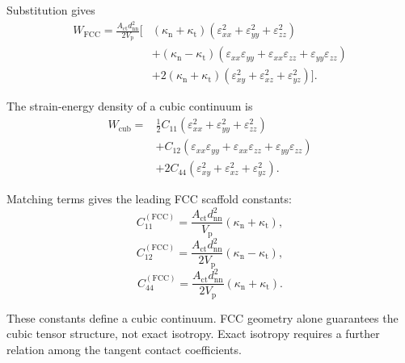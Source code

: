 Substitution gives
\begin{equation}
\begin{aligned}
    W_{\mathrm{FCC}} = \frac{A_{\mathrm{ct}}d_{\mathrm{nn}}^2}{2V_{\mathrm{p}}} \Big[ & (\kappa_{\mathrm{n}}+\kappa_{\mathrm{t}}) (\varepsilon_{xx}^2+\varepsilon_{yy}^2+\varepsilon_{zz}^2) \\
    & + (\kappa_{\mathrm{n}}-\kappa_{\mathrm{t}}) (\varepsilon_{xx}\varepsilon_{yy} +\varepsilon_{xx}\varepsilon_{zz} +\varepsilon_{yy}\varepsilon_{zz}) \\
    & + 2(\kappa_{\mathrm{n}}+\kappa_{\mathrm{t}}) (\varepsilon_{xy}^2+\varepsilon_{xz}^2+\varepsilon_{yz}^2) \Big].
\end{aligned}
\end{equation}

The strain-energy density of a cubic continuum is
\begin{equation}
\begin{aligned}
    W_{\mathrm{cub}} ={}& \frac{1}{2} C_{11} (\varepsilon_{xx}^2+\varepsilon_{yy}^2+\varepsilon_{zz}^2) \\
    & + C_{12} (\varepsilon_{xx}\varepsilon_{yy} +\varepsilon_{xx}\varepsilon_{zz} +\varepsilon_{yy}\varepsilon_{zz}) \\
    & + 2C_{44} (\varepsilon_{xy}^2+\varepsilon_{xz}^2+\varepsilon_{yz}^2).
\end{aligned}
\end{equation}

Matching terms gives the leading FCC scaffold constants:
\begin{equation}
    C_{11}^{(\mathrm{FCC})} = \frac{A_{\mathrm{ct}}d_{\mathrm{nn}}^2}{V_{\mathrm{p}}} (\kappa_{\mathrm{n}}+\kappa_{\mathrm{t}}),
\end{equation}
\begin{equation}
    C_{12}^{(\mathrm{FCC})} = \frac{A_{\mathrm{ct}}d_{\mathrm{nn}}^2}{2V_{\mathrm{p}}} (\kappa_{\mathrm{n}}-\kappa_{\mathrm{t}}),
\end{equation}
\begin{equation}
    C_{44}^{(\mathrm{FCC})} = \frac{A_{\mathrm{ct}}d_{\mathrm{nn}}^2}{2V_{\mathrm{p}}} (\kappa_{\mathrm{n}}+\kappa_{\mathrm{t}}).
\end{equation}

These constants define a cubic continuum. FCC geometry alone guarantees the cubic tensor structure, not exact isotropy. Exact isotropy requires a further relation among the tangent contact coefficients.

